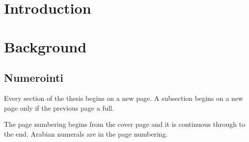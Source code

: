 \vspace{5mm}
{\hfill \ThesisAuthor \hspace{1cm}}

\newpage


\thesistableofcontents



\printnoidxglossary[type=symbolslist, style=long]

\printnoidxglossary[type=operatorslist, style=long]

\printnoidxglossary[type=\acronymtype, style=long, title={Abbreviations}] 

\cleardoublepage

\section{Introduction}


\thispagestyle{empty}


\clearpage

\section{Background}



\subsection*{Numerointi}

Every section of the thesis begins on a new page. A subsection begins on a new 
page only if the previous page a full.

The page numbering begins from the cover page and it is continuous through to 
the end. Arabian numerals are in the page numbering.

